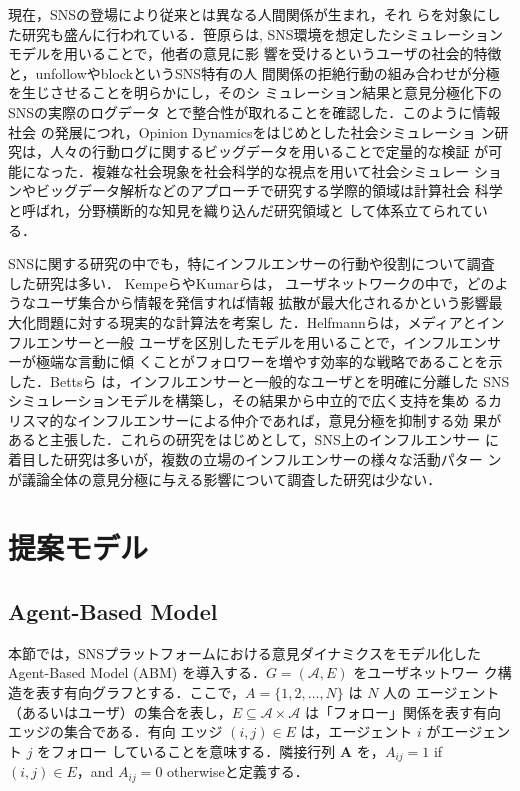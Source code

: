 \documentclass[a4j]{ujarticle}
\def\AgentSet{\mathcal{A}}
\begin{document}
現在，SNSの登場により従来とは異なる人間関係が生まれ，それ
らを対象にした研究も盛んに行われている．笹原ら\cite{Sasahara2021}は,
SNS環境を想定したシミュレーションモデルを用いることで，他者の意見に影
響を受けるというユーザの社会的特徴と，unfollowやblockというSNS特有の人
間関係の拒絶行動の組み合わせが分極を生じさせることを明らかにし，そのシ
ミュレーション結果と意見分極化下のSNSの実際のログデータ
\cite{Conover2021}とで整合性が取れることを確認した．このように情報社会
の発展につれ，Opinion Dynamicsをはじめとした社会シミュレーショ
ン研究は，人々の行動ログに関するビッグデータを用いることで定量的な検証
が可能になった．複雑な社会現象を社会科学的な視点を用いて社会シミュレー
ションやビッグデータ解析などのアプローチで研究する学際的領域は計算社会
科学 \cite{Lazer2009}と呼ばれ，分野横断的な知見を織り込んだ研究領域と
して体系立てられている．
\par


SNSに関する研究の中でも，特にインフルエンサーの行動や役割について調査
した研究は多い． Kempeら\cite{Kempe2003}やKumarら\cite{Kumar2022}は，
ユーザネットワークの中で，どのようなユーザ集合から情報を発信すれば情報
拡散が最大化されるかという影響最大化問題に対する現実的な計算法を考案し
た．Helfmannら\cite{Helfmann2023}は，メディアとインフルエンサーと一般
ユーザを区別したモデルを用いることで，インフルエンサーが極端な言動に傾
くことがフォロワーを増やす効率的な戦略であることを示した．Bettsら
\cite{Betts2023}は，インフルエンサーと一般的なユーザとを明確に分離した
SNSシミュレーションモデルを構築し，その結果から中立的で広く支持を集め
るカリスマ的なインフルエンサーによる仲介であれば，意見分極を抑制する効
果があると主張した．これらの研究をはじめとして，SNS上のインフルエンサー
に着目した研究は多いが，複数の立場のインフルエンサーの様々な活動パター
ンが議論全体の意見分極に与える影響について調査した研究は少ない．
\par


\section{提案モデル}
\subsection{Agent-Based Model}
本節では，SNSプラットフォームにおける意見ダイナミクスをモデル化した
Agent-Based Model (ABM) を導入する．$G=(\AgentSet,E)$ をユーザネットワー
ク構造を表す有向グラフとする．ここで，$A=\{1,2,\ldots,N\}$ は $N$ 人の
エージェント（あるいはユーザ）の集合を表し，$E \subseteq \AgentSet
\times \AgentSet$ は「フォロー」関係を表す有向エッジの集合である．有向
エッジ $(i,j)\in E$ は，エージェント $i$ がエージェント $j$ をフォロー
していることを意味する．隣接行列 $\mathbf{A}$ を，$A_{ij}=1$ if
$(i,j)\in E$，and $A_{ij}=0$ otherwiseと定義する．
\end{document}
